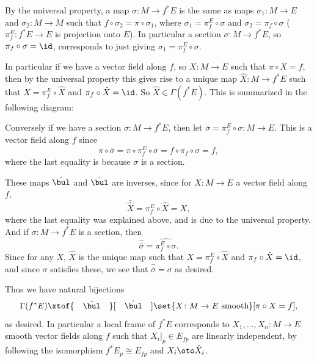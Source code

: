     \item By the universal property, a map $\sigma\colon M\to f^*E$ is the same as maps $\sigma_1\colon M\to E$ and $\sigma_2\colon M\to M$ such that $f\circ\sigma_2=\pi\circ\sigma_1$,
    where $\sigma_1=\pi_f^E\circ\sigma$ and $\sigma_2=\pi_f\circ\sigma$ ($\pi_f^E\colon f^*E\to E$ is projection onto $E$).
    In particular a section $\sigma\colon M\to f^*E$, so $\pi_f\circ\sigma=\id$, corresponds to just giving $\sigma_1=\pi_f^E\circ\sigma$.

    In particular if we have a vector field along $f$, so $X\colon M\to E$ such that $\pi\circ X=f$, then by the universal property this gives rise to a unique map $\hat X\colon M\to f^*E$ such
    that $X=\pi_f^E\circ\hat X$ and $\pi_f\circ\hat X=\id$.
    So $\hat X\in\Gamma(f^*E)$.
    This is summarized in the following diagram:

    \bigskip
    \centerline{}

    Conversely if we have a section $\sigma\colon M\to f^*E$, then let $\bar\sigma=\pi_f^E\circ\sigma\colon M\to E$.
    This is a vector field along $f$ since
    $$ \pi\circ\bar\sigma = \pi\circ\pi_f^E\circ\sigma = f\circ\pi_f\circ\sigma = f , $$
    where the last equality is because $\sigma$ is a section.

    These maps $\hat\bul$ and $\bar\bul$ are inverses, since for $X\colon M\to E$ a vector field along $f$,
    $$ \bar{\hat X} = \pi_f^E\circ\hat X = X , $$
    where the last equality was explained above, and is due to the universal property.
    And if $\sigma\colon M\to f^*E$ is a section, then
    $$ \hat{\bar\sigma} = \hat{\pi_f^E\circ\sigma} . $$
    Since for any $X$, $\hat X$ is the unique map such that $X=\pi_f^E\circ\hat X$ and $\pi_f\circ\hat X=\id$, and since $\sigma$ satisfies these, we see that $\hat{\bar\sigma}=\sigma$
    as desired.

    Thus we have natural bijections
    $$ \Gamma(f^*E) \xtof{\quad\bar\bul\quad}[\quad\hat\bul\quad] \set{X\colon M\to E\hbox{ smooth}}[\pi\circ X=f] , $$
    as desired.
    In particular a local frame of $f^*E$ corresponds to $X_1,\dots,X_n\colon M\to E$ smooth vector fields along $f$ such that $X_i|_p\in E_{fp}$ are linearly independent, by following the isomorphism
    $f^*E_p\cong E_{fp}$ and $X_i\oto\hat X_i$.

